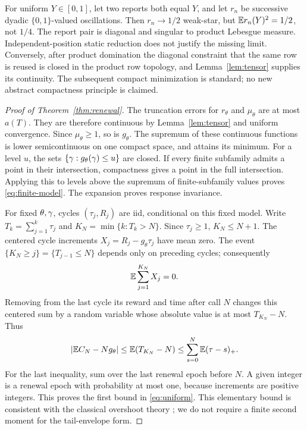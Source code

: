 \begin{remark}\label{rem:diagonal}
For uniform $Y\in[0,1]$, let two reports both equal $Y$, and let $r_n$ be successive dyadic $\{0,1\}$-valued oscillations. Then $r_n\to1/2$ weak-star, but $\mathbb E r_n(Y)^2=1/2$, not $1/4$. The report pair is diagonal and singular to product Lebesgue measure. Independent-position static reduction does not justify the missing limit. Conversely, after product domination the diagonal constraint that the same row is reused is closed in the product row topology, and Lemma~\ref{lem:tensor} supplies its continuity. The subsequent compact minimization is standard; no new abstract compactness principle is claimed.
\end{remark}

\begin{proof}[Proof of Theorem~\ref{thm:renewal}]
The truncation errors for $r_\theta$ and $\mu_\theta$ are at most $a(T)$. They are therefore continuous by Lemma~\ref{lem:tensor} and uniform convergence. Since $\mu_\theta\ge1$, so is $g_\theta$. The supremum of these continuous functions is lower semicontinuous on one compact space, and attains its minimum. For a level $u$, the sets $\{\gamma:g_\theta(\gamma)\le u\}$ are closed. If every finite subfamily admits a point in their intersection, compactness gives a point in the full intersection. Applying this to levels above the supremum of finite-subfamily values proves \eqref{eq:finite-model}. The expansion proves response invariance.

For fixed $\theta,\gamma$, cycles $(\tau_j,R_j)$ are iid, conditional on this fixed model. Write $T_k=\sum_{j=1}^k\tau_j$ and $K_N=\min\{k:T_k>N\}$. Since $\tau_j\ge1$, $K_N\le N+1$. The centered cycle increments $X_j=R_j-g_\theta\tau_j$ have mean zero. The event $\{K_N\ge j\}=\{T_{j-1}\le N\}$ depends only on preceding cycles; consequently
\[
 \mathbb E\sum_{j=1}^{K_N}X_j=0.
\]
Removing from the last cycle its reward and time after call $N$ changes this centered sum by a random variable whose absolute value is at most $T_{K_N}-N$. Thus
\begin{equation}\label{eq:overshoot}
 |\mathbb E C_N-Ng_\theta|\le\mathbb E(T_{K_N}-N)
 \le\sum_{s=0}^N\mathbb E(\tau-s)_+.
\end{equation}
For the last inequality, sum over the last renewal epoch before $N$. A given integer is a renewal epoch with probability at most one, because increments are positive integers. This proves the first bound in \eqref{eq:uniform}. This elementary bound is consistent with the classical overshoot theory \cite{Lorden}; we do not require a finite second moment for the tail-envelope form.


\end{proof}

